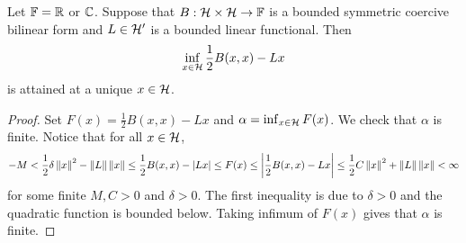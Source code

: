 \begin{theorem}
    Let $\mathbb{F} = \mathbb{R}$ or $\mathbb{C}$. Suppose that $B:\mathcal{H}\times\mathcal{H}\to\mathbb{F}$ is 
    a bounded symmetric coercive bilinear form and $L\in\mathcal{H}'$ is a bounded 
    linear functional. Then 
    \begin{equation*}
        \inf_{x\in\mathcal{H}} \frac{1}{2}B(x,x) - Lx
    \end{equation*}
    is attained at a unique $x\in\mathcal{H}$.
\end{theorem}
\begin{proof}
    Set $F(x) = \frac{1}{2}B(x,x) - Lx$ and $\alpha = \inf_{x\in\mathcal{H}} F(x)$. 
    We check that $\alpha$ is finite. Notice that for all $x\in\mathcal{H}$,
    \begin{equation*}
        -M < \frac{1}{2}\delta\left\lVert {x} \right\rVert^2 - \left\lVert {L} \right\rVert\left\lVert {x} \right\rVert 
        \leq \frac{1}{2}B(x,x) - \left\lvert {Lx} \right\rvert \leq F(x) 
        \leq \left\lvert {\frac{1}{2}B(x,x)-Lx} \right\rvert \leq \frac{1}{2}C\left\lVert {x} \right\rVert^2 + \left\lVert {L} \right\rVert\left\lVert {x} \right\rVert < \infty
    \end{equation*}
    for some finite $M,C>0$ and $\delta>0$. The first inequality is due to 
    $\delta>0$ and the quadratic function is bounded below. Taking infimum 
    of $F(x)$ gives that $\alpha$ is finite. 


\end{proof}
